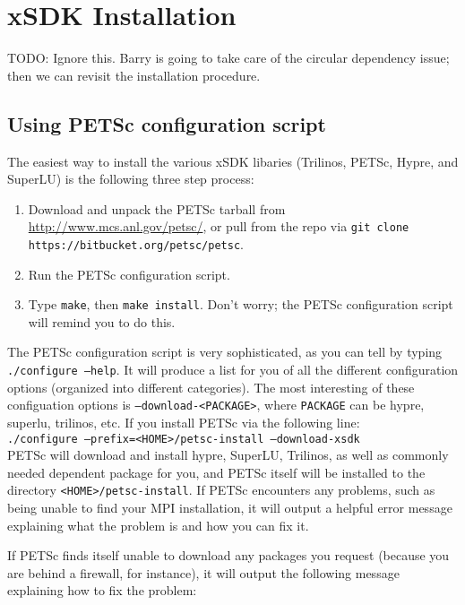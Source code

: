 \chapter{xSDK Installation}
{\color{red}TODO: Ignore this.  Barry is going to take care of the circular
dependency issue; then we can revisit the installation procedure.}

\section{Using PETSc configuration script}
The easiest way to install the various xSDK libaries (Trilinos, PETSc, Hypre,
and SuperLU) is the following three step process:

\begin{enumerate}
  \item Download and unpack the PETSc tarball from
  \url{http://www.mcs.anl.gov/petsc/}, or pull from the repo via {\tt git clone
  https://bitbucket.org/petsc/petsc}.
  \item Run the PETSc configuration script.
  \item Type {\tt make}, then {\tt make install}.  Don't worry; the PETSc
  configuration script will remind you to do this.
\end{enumerate}

The PETSc configuration script is very sophisticated, as you can tell by typing
{\tt ./configure --help}.  It will produce a list for you of all the different
configuration options (organized into different categories).  The most
interesting of these configuation options is {\tt --download-<PACKAGE>}, where
{\tt PACKAGE} can be hypre, superlu, trilinos, etc.  If you install PETSc via
the following line:
\\
{\tt ./configure --prefix=<HOME>/petsc-install --download-xsdk}
\\
PETSc will download and install hypre, SuperLU, Trilinos, as well as commonly needed dependent package for you, and PETSc itself will
be installed to the directory {\tt <HOME>/petsc-install}.  If PETSc encounters
any problems, such as being unable to find your MPI installation, it will output
a helpful error message explaining what the problem is and how you can fix it.

If PETSc finds itself unable to download any packages you request (because you
are behind a firewall, for instance), it will output the following message
explaining how to fix the problem:

